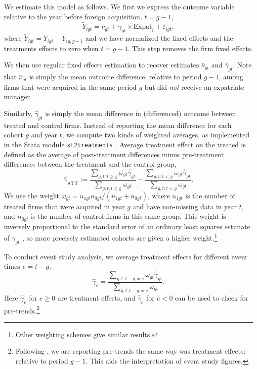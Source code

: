 \documentclass[12pt,a4paper]{article}
\begin{document}
We estimate this model as follows. We first we express the outcome variable relative to the year before foreign acquisition, $t=g-1$,
\begin{equation}\label{eq:reg2}
    \tilde Y_{igt} = \nu_{gt} + \gamma_{gt}\times \text{Expat}_i + \tilde\varepsilon_{igt},
\end{equation}
where $\tilde Y_{igt} = Y_{igt} - Y_{ig,g-1}$ and we have normalized the fixed effects and the treatments effects to zero when $t=g-1$. This step removes the firm fixed effects. 

We then use regular fixed effects estimation \citep[version 6.12.5]{reghdfe} to recover estimates $\hat\nu_{gt}$ and $\hat\gamma_{gt}$. Note that $\hat\nu_{gt}$ is simply the mean outcome difference, relative to period $g-1$, among firms that were acquired in the same period $g$ but did \emph{not} receive an expatriate manager. 

Similarly, $\hat\gamma_{gt}$ is simply the mean difference in (differenced) outcome between treated and control firms. Instead of reporting the mean difference for each cohort $g$ and year $t$, we compute two kinds of weighted averages, as implemented in the Stata module \texttt{xt2treatments} \cite[version 0.8.4]{xt2treatments}. Average treatment effect on the treated is defined as the average of post-treatment differences minus pre-treatment differences between the treatment and the control group,
\begin{equation}
    \hat\gamma_{\text{ATT}} := \frac{\sum_{g,t: t\ge g}\omega_{gt}\hat \gamma_{gt}}{\sum_{g,t: t\ge g}\omega_{gt}} - 
    \frac{\sum_{g,t: t < g}\omega_{gt}\hat \gamma_{gt}}{\sum_{g,t: t < g}\omega_{gt}}.
\end{equation}
We use the weight $\omega_{gt} = n_{1gt} n_{0gt}/(n_{1gt}+n_{0gt})$, where $n_{1gt}$ is the number of treated firms that were acquired in year $g$ and have non-missing data in year $t$, and $n_{0gt}$ is the number of control firms in this same group. This weight is inversely proportional to the standard error of an ordinary least squares estimate of $\gamma_{gt}$ \citep[Chapter 4, Section 4.2]{greene}, so more precisely estimated cohorts are given a higher weight.\footnote{Other weighting schemes give similar results.}

To conduct event study analysis, we average treatment effects for different event times $e=t-g$,
\begin{equation}
    \hat\gamma_{e} = \frac{\sum_{g,t: t-g=e}\omega_{gt}\hat \gamma_{gt}}
    {\sum_{g,t: t-g=e}\omega_{gt}}.
\end{equation}
Here $\hat\gamma_{e}$ for $e\ge 0$ are treatment effects, and $\hat\gamma_{e}$ for $e<0$ can be used to check for pre-trends.\footnote{Following \cite{Roth2024-ux}, we are reporting pre-trends the same way was treatment effects: relative to period $g-1$. This aids the interpretation of event study figures.}
\end{document}
